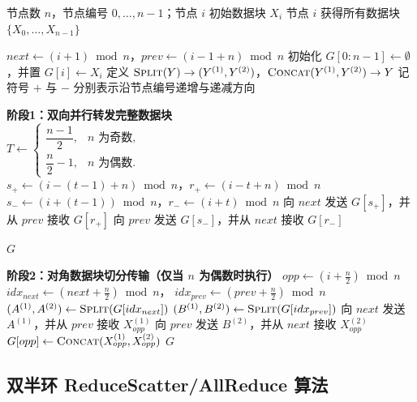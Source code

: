 \begin{algorithm}[!htbp]
\caption{双半环 AllGather（Double Half-Ring AllGather）}
\label{alg:double_half_ring_allgather}
\begin{algorithmic}[1]
\REQUIRE 节点数 $n$，节点编号 $0,\dots,n-1$；节点 $i$ 初始数据块 $X_i$
\ENSURE 节点 $i$ 获得所有数据块 $\{X_0,\dots,X_{n-1}\}$

\STATE $next \leftarrow (i+1)\bmod n$，$prev \leftarrow (i-1+n)\bmod n$
\STATE 初始化 $G[0:n-1]\leftarrow\emptyset$，并置 $G[i]\leftarrow X_i$
\STATE 定义 $\textsc{Split}(Y)\rightarrow (Y^{(1)},Y^{(2)})$，$\textsc{Concat}(Y^{(1)},Y^{(2)})\rightarrow Y$
\STATE 记符号 $+$ 与 $-$ 分别表示沿节点编号递增与递减方向

\STATE \textbf{阶段1：双向并行转发完整数据块}
\\[0.5em]
\STATE $T \leftarrow 
\begin{cases}
\dfrac{n-1}{2}, & n \text{ 为奇数},\\[0.2em]
\dfrac{n}{2}-1, & n \text{ 为偶数}.
\end{cases}$
\\[0.5em]
    \STATE $s_{+}\leftarrow(i-(t-1)+n)\bmod n$，$r_{+}\leftarrow(i-t+n)\bmod n$
    \STATE $s_{-}\leftarrow(i+(t-1))\bmod n$，$r_{-}\leftarrow(i+t)\bmod n$
    \STATE 向 $next$ 发送 $G[s_{+}]$，并从 $prev$ 接收 $G[r_{+}]$
    \STATE 向 $prev$ 发送 $G[s_{-}]$，并从 $next$ 接收 $G[r_{-}]$
\ENDFOR

    \RETURN $G$
\ENDIF

\STATE \textbf{阶段2：对角数据块切分传输（仅当 $n$ 为偶数时执行）}
\STATE $opp\leftarrow\left(i+\frac{n}{2}\right)\bmod n$
\STATE $idx_{next}\leftarrow\left(next+\frac{n}{2}\right)\bmod n$，
       $idx_{prev}\leftarrow\left(prev+\frac{n}{2}\right)\bmod n$
\STATE $(A^{(1)},A^{(2)})\leftarrow\textsc{Split}(G[idx_{next}])$
\STATE $(B^{(1)},B^{(2)})\leftarrow\textsc{Split}(G[idx_{prev}])$
\STATE 向 $next$ 发送 $A^{(1)}$，并从 $prev$ 接收 $X_{opp}^{(1)}$
\STATE 向 $prev$ 发送 $B^{(2)}$，并从 $next$ 接收 $X_{opp}^{(2)}$
\STATE $G[opp]\leftarrow\textsc{Concat}(X_{opp}^{(1)},X_{opp}^{(2)})$
\RETURN $G$
\end{algorithmic}
\end{algorithm}



\subsection{双半环 ReduceScatter/AllReduce 算法}

